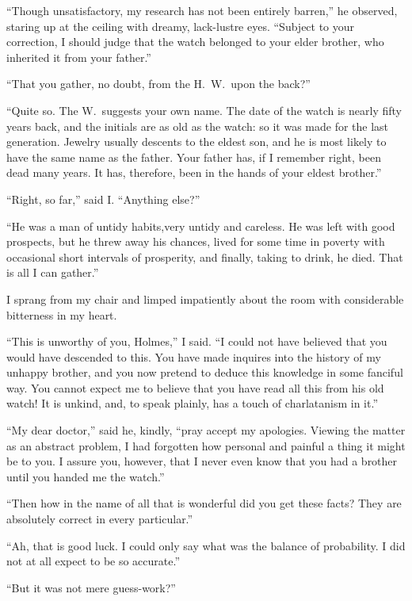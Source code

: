 \documentclass[12pt,english,oneside]{book}
\begin{document}
{}``Though unsatisfactory, my research has not been entirely barren,''
he observed, staring up at the ceiling with dreamy, lack-lustre eyes.
{}``Subject to your correction, I should judge that the watch belonged
to your elder brother, who inherited it from your father.''

{}``That you gather, no doubt, from the H.\ W.\ upon the back?''

{}``Quite so. The W.\ suggests your own name. The date of the watch
is nearly fifty years back, and the initials are as old as the watch:
so it was made for the last generation. Jewelry usually descents to
the eldest son, and he is most likely to have the same name as the
father. Your father has, if I remember right, been dead many years.
It has, therefore, been in the hands of your eldest brother.''

{}``Right, so far,'' said I. {}``Anything else?''

{}``He was a man of untidy habits,\mdsh{---}very untidy and careless.
He was left with good prospects, but he threw away his chances, lived
for some time in poverty with occasional short intervals of prosperity,
and finally, taking to drink, he died. That is all I can gather.''

I sprang from my chair and limped impatiently about the room with
considerable bitterness in my heart.

{}``This is unworthy of you, Holmes,'' I said. {}``I could not
have believed that you would have descended to this. You have made
inquires into the history of my unhappy brother, and you now pretend
to deduce this knowledge in some fanciful way. You cannot expect me
to believe that you have read all this from his old watch! It is unkind,
and, to speak plainly, has a touch of charlatanism in it.''

{}``My dear doctor,'' said he, kindly, {}``pray accept my apologies.
Viewing the matter as an abstract problem, I had forgotten how personal
and painful a thing it might be to you. I assure you, however, that
I never even know that you had a brother until you handed me the watch.''

{}``Then how in the name of all that is wonderful did you get these
facts? They are absolutely correct in every particular.''

{}``Ah, that is good luck. I could only say what was the balance
of probability. I did not at all expect to be so accurate.''

{}``But it was not mere guess-work?''
\end{document}
